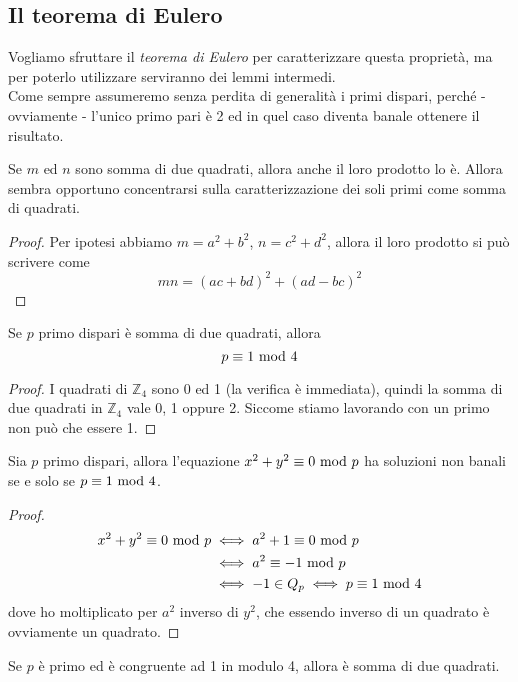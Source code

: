 \subsection{Il teorema di Eulero}
Vogliamo sfruttare il \textit{teorema di Eulero} per caratterizzare questa proprietà, ma per poterlo utilizzare serviranno dei lemmi intermedi. \\ Come sempre assumeremo senza perdita di generalità i primi dispari, perché - ovviamente - l'unico primo pari è 2 ed in quel caso diventa banale ottenere il risultato.
\begin{lemma}
	\label{prodotto_di_somme_di_quadrati}
	Se $m$ ed $n$ sono somma di due quadrati, allora anche il loro prodotto lo è. Allora sembra opportuno concentrarsi sulla caratterizzazione dei soli primi come somma di quadrati.
\end{lemma}
\begin{proof}
	Per ipotesi abbiamo $m=a^2+b^2$, $n=c^2+d^2$, allora il loro prodotto si può scrivere come
	\begin{equation*}
	mn=(ac+bd)^2+(ad-bc)^2
	\end{equation*}
\end{proof}
\begin{lemma}
	Se $p$ primo dispari è somma di due quadrati, allora 
	\begin{equation*}
	p\equiv1\ \mathrm{mod}\ 4
	\end{equation*}
\end{lemma}
\begin{proof}
	I quadrati di $\mathbb{Z}_4$ sono 0 ed 1 (la verifica è immediata), quindi la somma di due quadrati in $\mathbb{Z}_4$ vale 0, 1 oppure 2.
	Siccome stiamo lavorando con un primo non può che essere 1.
\end{proof}
\begin{lemma}
	Sia $p$ primo dispari, allora l'equazione $x^2+y^2\equiv0\ \mathrm{mod}\ p$ ha soluzioni non banali se e solo se $p\equiv1\ \mathrm{mod}\ 4$.
\end{lemma}
\begin{proof}
	\begin{align*}
		x^2+y^2\equiv0\ \mathrm{mod}\ p 
		& \iff a^2+1\equiv0\ \mathrm{mod}\ p \\
		& \iff a^2\equiv-1\ \mathrm{mod}\ p \\
		& \iff -1 \in Q_p \iff p\equiv1\ \mathrm{mod}\ 4
	\end{align*}
	dove ho moltiplicato per $a^2$ inverso di $y^2$, che essendo inverso di un quadrato è ovviamente un quadrato.
\end{proof}
\begin{lemma}
	Se $p$ è primo ed è congruente ad 1 in modulo 4, allora è somma di due quadrati.
\end{lemma}
